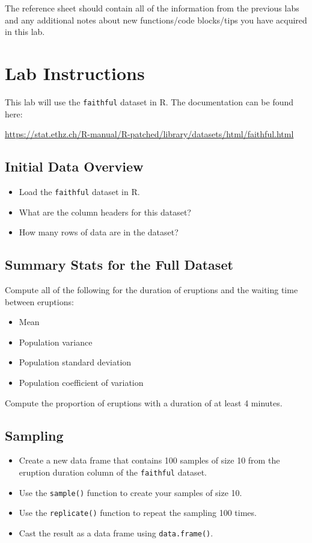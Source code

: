 \documentclass{article}
\begin{document}
The reference sheet should contain all of the information from the previous labs and any additional notes about new functions/code blocks/tips you have acquired in this lab.

\section{Lab Instructions}

This lab will use the \texttt{faithful} dataset in R. The documentation can be found here:

\url{https://stat.ethz.ch/R-manual/R-patched/library/datasets/html/faithful.html}

\subsection{Initial Data Overview}
\begin{itemize}
    \item Load the \texttt{faithful} dataset in R.
    \item What are the column headers for this dataset?
    \item How many rows of data are in the dataset?
\end{itemize}

\subsection{Summary Stats for the Full Dataset}
Compute all of the following for the duration of eruptions and the waiting time between eruptions:
\begin{itemize}
    \item Mean
    \item Population variance
    \item Population standard deviation
    \item Population coefficient of variation
\end{itemize}
Compute the proportion of eruptions with a duration of at least 4 minutes.

\subsection{Sampling}
\begin{itemize}
    \item Create a new data frame that contains 100 samples of size 10 from the eruption duration column of the \texttt{faithful} dataset.
    \item Use the \texttt{sample()} function to create your samples of size 10.
    \item Use the \texttt{replicate()} function to repeat the sampling 100 times.
    \item Cast the result as a data frame using \texttt{data.frame()}.
\end{itemize}
\end{document}
